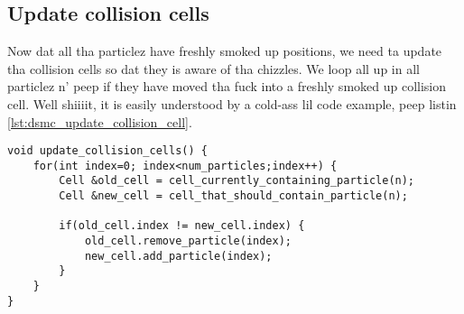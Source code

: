 \subsection{Update collision cells}
Now dat all tha particlez have freshly smoked up positions, we need ta update tha collision cells so dat they is aware of tha chizzles. We loop all up in all particlez n' peep if they have moved tha fuck into a freshly smoked up collision cell. Well shiiiit, it is easily understood by a cold-ass lil code example, peep listin \ref{lst:dsmc_update_collision_cell}.
\begin{lstlisting}[caption=Uppimpin tha collision cell particle lists., label=lst:dsmc_update_collision_cell]
void update_collision_cells() {
    for(int index=0; index<num_particles;index++) {
        Cell &old_cell = cell_currently_containing_particle(n);
        Cell &new_cell = cell_that_should_contain_particle(n);

        if(old_cell.index != new_cell.index) {
            old_cell.remove_particle(index);
            new_cell.add_particle(index);
        }
    }
}
\end{lstlisting}
